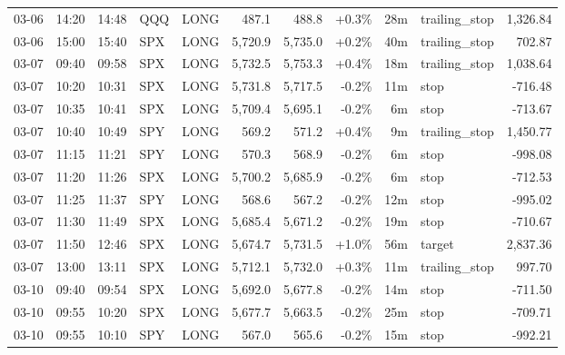 \documentclass[11pt,a4paper,twoside]{article}
\begin{document}
\begin{center}
\begin{longtable}{>{\color{txtmain}}l l l l l r r r r >{\color{txtmain}}l r}
03-06 & 14:20 & 14:48 & QQQ & LONG & 487.1 & 488.8 & \textcolor{wingreen}{+0.3\%} & 28m & trailing\_stop & \textcolor{wingreen}{1,326.84} \\
03-06 & 15:00 & 15:40 & SPX & LONG & 5,720.9 & 5,735.0 & \textcolor{wingreen}{+0.2\%} & 40m & trailing\_stop & \textcolor{wingreen}{702.87} \\
03-07 & 09:40 & 09:58 & SPX & LONG & 5,732.5 & 5,753.3 & \textcolor{wingreen}{+0.4\%} & 18m & trailing\_stop & \textcolor{wingreen}{1,038.64} \\
03-07 & 10:20 & 10:31 & SPX & LONG & 5,731.8 & 5,717.5 & \textcolor{lossred}{-0.2\%} & 11m & stop & \textcolor{lossred}{-716.48} \\
03-07 & 10:35 & 10:41 & SPX & LONG & 5,709.4 & 5,695.1 & \textcolor{lossred}{-0.2\%} & 6m & stop & \textcolor{lossred}{-713.67} \\
03-07 & 10:40 & 10:49 & SPY & LONG & 569.2 & 571.2 & \textcolor{wingreen}{+0.4\%} & 9m & trailing\_stop & \textcolor{wingreen}{1,450.77} \\
03-07 & 11:15 & 11:21 & SPY & LONG & 570.3 & 568.9 & \textcolor{lossred}{-0.2\%} & 6m & stop & \textcolor{lossred}{-998.08} \\
03-07 & 11:20 & 11:26 & SPX & LONG & 5,700.2 & 5,685.9 & \textcolor{lossred}{-0.2\%} & 6m & stop & \textcolor{lossred}{-712.53} \\
03-07 & 11:25 & 11:37 & SPY & LONG & 568.6 & 567.2 & \textcolor{lossred}{-0.2\%} & 12m & stop & \textcolor{lossred}{-995.02} \\
03-07 & 11:30 & 11:49 & SPX & LONG & 5,685.4 & 5,671.2 & \textcolor{lossred}{-0.2\%} & 19m & stop & \textcolor{lossred}{-710.67} \\
03-07 & 11:50 & 12:46 & SPX & LONG & 5,674.7 & 5,731.5 & \textcolor{wingreen}{+1.0\%} & 56m & target & \textcolor{wingreen}{2,837.36} \\
03-07 & 13:00 & 13:11 & SPX & LONG & 5,712.1 & 5,732.0 & \textcolor{wingreen}{+0.3\%} & 11m & trailing\_stop & \textcolor{wingreen}{997.70} \\
03-10 & 09:40 & 09:54 & SPX & LONG & 5,692.0 & 5,677.8 & \textcolor{lossred}{-0.2\%} & 14m & stop & \textcolor{lossred}{-711.50} \\
03-10 & 09:55 & 10:20 & SPX & LONG & 5,677.7 & 5,663.5 & \textcolor{lossred}{-0.2\%} & 25m & stop & \textcolor{lossred}{-709.71} \\
03-10 & 09:55 & 10:10 & SPY & LONG & 567.0 & 565.6 & \textcolor{lossred}{-0.2\%} & 15m & stop & \textcolor{lossred}{-992.21} \\

\end{longtable}
\end{center}
\end{document}
